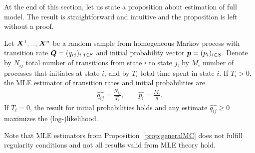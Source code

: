 {

At the end of this section, let us state a proposition about estimation of full model. The result is straightforward and intuitive and the proposition is left without a proof.

\begin{proposition}
	Let $\bm{X}^1, ..., \bm{X}^n$ be a random sample from homogeneous Markov process with transition rate $\bm{Q} = (q_{ij})_{i,j \in S}$ and initial probability vector $\bm{p} = (p_i)_{i \in S}$. Denote by $N_{ij}$ total number of transitions from state $i$ to state $j$, by $M_i$ number of processes that initiates at state $i$, and by $T_i$ total time spent in state $i$. If $T_i > 0$, the MLE estimator of transition rates and initial probabilities are
	\begin{align*}
		\widehat{q_{ij}} = \frac{N_{ij}}{T_i}, \qquad
		\widehat{p_i} = \frac{M_i}{n}.
	\end{align*}
	If $T_i = 0$, the result for initial probabilities holds and any estimate $\widehat{q_{ij}} \geq 0$ maximizes the (log-)likelihood.
	\label{prop:generalMC}
\end{proposition}

Note that MLE estimators from Proposition~\ref{prop:generalMC} does not fulfill regularity conditions and not all results valid from MLE theory hold.




}
